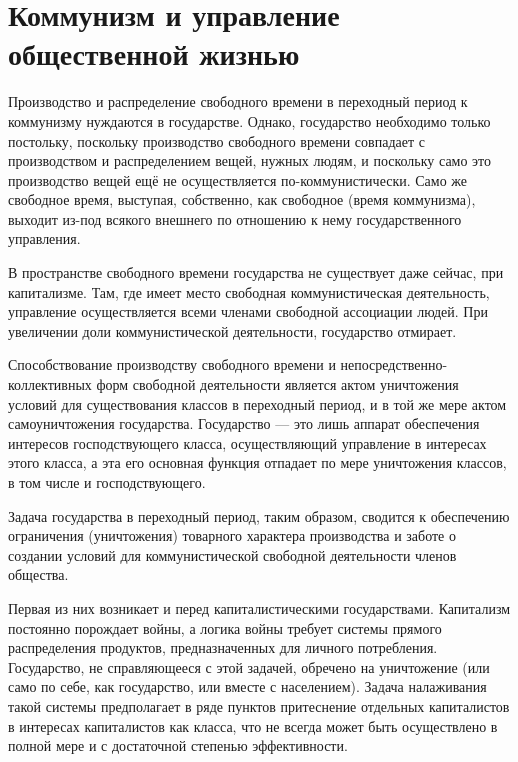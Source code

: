 \documentclass[../main]{subfiles}
\begin{document}
\ifSubfilesClassLoaded{\setcounter{page}{40}}{}
\section{Коммунизм и управление общественной жизнью}
\label{sec:07_kommunizm_upravlenie}

Производство и распределение свободного времени в переходный период к коммунизму нуждаются в государстве. Однако, государство необходимо только постольку, поскольку производство свободного времени совпадает с производством и распределением вещей, нужных людям, и поскольку само это производство вещей ещё не осуществляется по-коммунистически. Само же свободное время, выступая, собственно, как свободное (время коммунизма), выходит из-под всякого внешнего по отношению к нему государственного управления.

В пространстве свободного времени государства не существует даже сейчас, при капитализме. Там, где имеет место свободная коммунистическая деятельность, управление осуществляется всеми членами свободной ассоциации людей. При увеличении доли коммунистической деятельности, государство отмирает.

Способствование производству свободного времени и непосредственно-коллективных форм свободной деятельности является актом уничтожения условий для существования классов в переходный период, и в той же мере актом самоуничтожения государства. Государство — это лишь аппарат обеспечения интересов господствующего класса, осуществляющий управление в интересах этого класса, а эта его основная функция отпадает по мере уничтожения классов, в том числе и господствующего.

Задача государства в переходный период, таким образом, сводится к обеспечению ограничения (уничтожения) товарного характера производства и заботе о создании условий для коммунистической свободной деятельности членов общества.

Первая из них возникает и перед капиталистическими государствами. Капитализм постоянно порождает войны, а логика войны требует системы прямого распределения продуктов, предназначенных для личного потребления. Государство, не справляющееся с этой задачей, обречено на уничтожение (или само по себе, как государство, или вместе с населением). Задача налаживания такой системы предполагает в ряде пунктов притеснение отдельных капиталистов в интересах капиталистов как класса, что не всегда может быть осуществлено в полной мере и с достаточной степенью эффективности.
\end{document}

